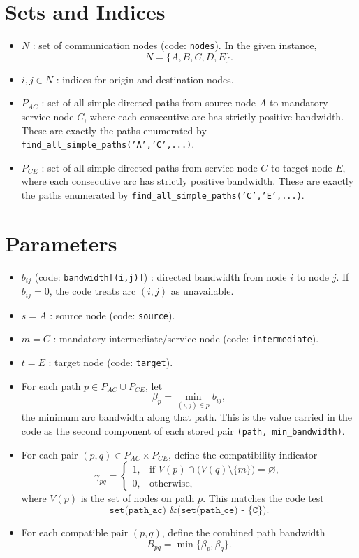 \section*{Sets and Indices}

\begin{itemize}
    \item $N$ : set of communication nodes (code: \texttt{nodes}). In the given instance,
    \[
    N=\{A,B,C,D,E\}.
    \]
    \item $i,j \in N$ : indices for origin and destination nodes.
    \item $P_{AC}$ : set of all simple directed paths from source node $A$ to mandatory service node $C$, where each consecutive arc has strictly positive bandwidth. These are exactly the paths enumerated by \texttt{find\_all\_simple\_paths('A','C',...)}.
    \item $P_{CE}$ : set of all simple directed paths from service node $C$ to target node $E$, where each consecutive arc has strictly positive bandwidth. These are exactly the paths enumerated by \texttt{find\_all\_simple\_paths('C','E',...)}.
\end{itemize}

\section*{Parameters}

\begin{itemize}
    \item $b_{ij}$ (code: \texttt{bandwidth[(i,j)]}) : directed bandwidth from node $i$ to node $j$. If $b_{ij}=0$, the code treats arc $(i,j)$ as unavailable.
    \item $s=A$ : source node (code: \texttt{source}).
    \item $m=C$ : mandatory intermediate/service node (code: \texttt{intermediate}).
    \item $t=E$ : target node (code: \texttt{target}).
    \item For each path $p \in P_{AC} \cup P_{CE}$, let
    \[
    \beta_p = \min_{(i,j)\in p} b_{ij},
    \]
    the minimum arc bandwidth along that path. This is the value carried in the code as the second component of each stored pair \texttt{(path, min\_bandwidth)}.
    \item For each pair $(p,q)\in P_{AC}\times P_{CE}$, define the compatibility indicator
    \[
    \gamma_{pq}=
    \begin{cases}
    1, & \text{if } V(p)\cap \bigl(V(q)\setminus\{m\}\bigr)=\varnothing,\\
    0, & \text{otherwise},
    \end{cases}
    \]
    where $V(p)$ is the set of nodes on path $p$. This matches the code test
    \[
    \texttt{set(path\_ac) \& (set(path\_ce) - \{C\})}.
    \]
    \item For each compatible pair $(p,q)$, define the combined path bandwidth
    \[
    B_{pq}=\min\{\beta_p,\beta_q\}.
    \]
\end{itemize}

